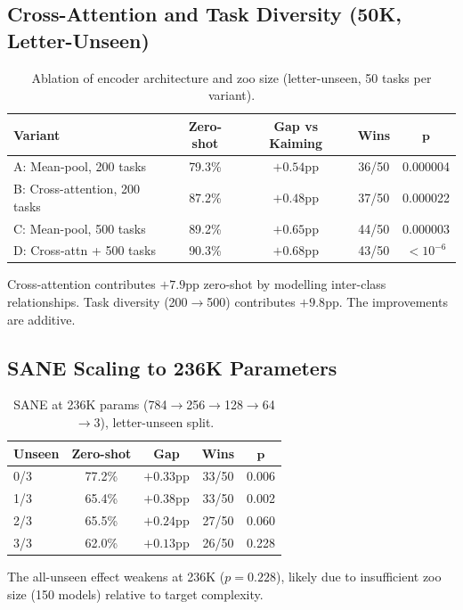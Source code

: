\documentclass[11pt,a4paper]{article}
\begin{document}
\subsection{Cross-Attention and Task Diversity (50K, Letter-Unseen)}

\begin{table}[H]
\centering
\caption{Ablation of encoder architecture and zoo size (letter-unseen, 50 tasks per variant).}
\begin{tabular}{lcccc}
\toprule
\textbf{Variant} & \textbf{Zero-shot} & \textbf{Gap vs Kaiming} & \textbf{Wins} & $\boldsymbol{p}$ \\
\midrule
A: Mean-pool, 200 tasks & 79.3\% & $+0.54$pp & 36/50 & 0.000004 \\
B: Cross-attention, 200 tasks & 87.2\% & $+0.48$pp & 37/50 & 0.000022 \\
C: Mean-pool, 500 tasks & 89.2\% & $+0.65$pp & 44/50 & 0.000003 \\
D: Cross-attn + 500 tasks & 90.3\% & $+0.68$pp & 43/50 & $< 10^{-6}$ \\
\bottomrule
\end{tabular}
\end{table}

Cross-attention contributes $+7.9$pp zero-shot by modelling inter-class relationships. Task diversity (200$\to$500) contributes $+9.8$pp. The improvements are additive.

\subsection{SANE Scaling to 236K Parameters}

\begin{table}[H]
\centering
\caption{SANE at 236K params (784$\to$256$\to$128$\to$64$\to$3), letter-unseen split.}
\begin{tabular}{lcccc}
\toprule
\textbf{Unseen} & \textbf{Zero-shot} & \textbf{Gap} & \textbf{Wins} & $\boldsymbol{p}$ \\
\midrule
0/3 & 77.2\% & $+0.33$pp & 33/50 & 0.006 \\
1/3 & 65.4\% & $+0.38$pp & 33/50 & 0.002 \\
2/3 & 65.5\% & $+0.24$pp & 27/50 & 0.060 \\
3/3 & 62.0\% & $+0.13$pp & 26/50 & 0.228 \\
\bottomrule
\end{tabular}
\end{table}

The all-unseen effect weakens at 236K ($p = 0.228$), likely due to insufficient zoo size (150 models) relative to target complexity.
\end{document}
